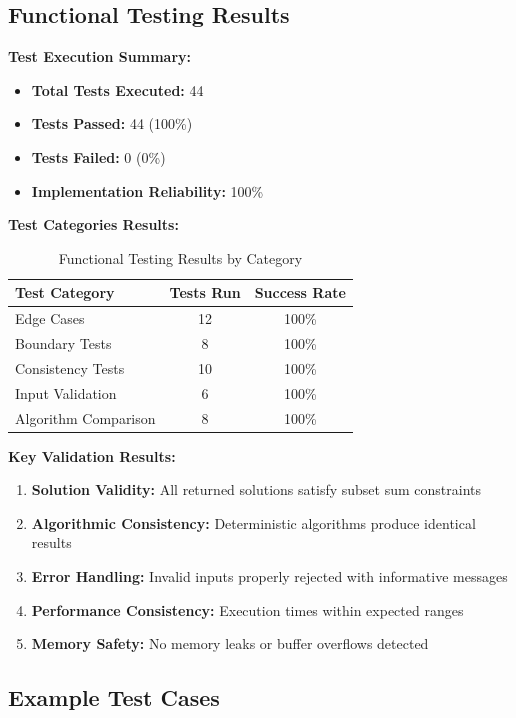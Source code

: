 \documentclass[12pt,a4paper]{article}
\begin{document}
\subsection{Functional Testing Results}

\textbf{Test Execution Summary:}
\begin{itemize}
\item \textbf{Total Tests Executed:} 44
\item \textbf{Tests Passed:} 44 (100\%)
\item \textbf{Tests Failed:} 0 (0\%)
\item \textbf{Implementation Reliability:} 100\%
\end{itemize}

\textbf{Test Categories Results:}

\begin{table}[H]
\centering
\begin{tabular}{@{}lcc@{}}
\toprule
Test Category & Tests Run & Success Rate \\
\midrule
Edge Cases & 12 & 100\% \\
Boundary Tests & 8 & 100\% \\
Consistency Tests & 10 & 100\% \\
Input Validation & 6 & 100\% \\
Algorithm Comparison & 8 & 100\% \\
\bottomrule
\end{tabular}
\caption{Functional Testing Results by Category}
\end{table}

\textbf{Key Validation Results:}
\begin{enumerate}
\item \textbf{Solution Validity:} All returned solutions satisfy subset sum constraints
\item \textbf{Algorithmic Consistency:} Deterministic algorithms produce identical results
\item \textbf{Error Handling:} Invalid inputs properly rejected with informative messages
\item \textbf{Performance Consistency:} Execution times within expected ranges
\item \textbf{Memory Safety:} No memory leaks or buffer overflows detected
\end{enumerate}

\subsection{Example Test Cases}
\end{document}
